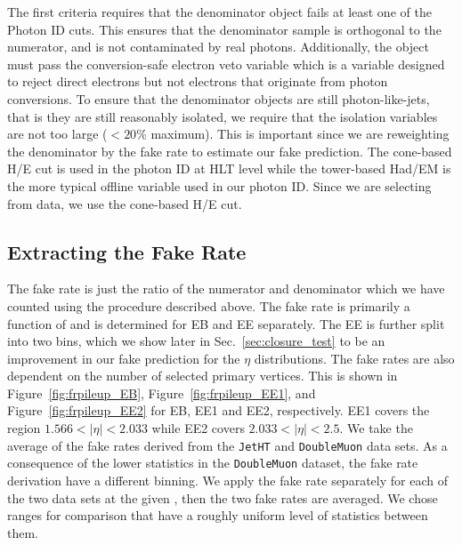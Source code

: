 The first criteria requires that the denominator object fails at least one of the Photon ID cuts. This ensures that the denominator sample is orthogonal to the numerator, and is not contaminated by real photons. Additionally, the object must pass the conversion-safe electron veto variable which is a variable designed to reject direct electrons but not electrons that originate from photon conversions. To ensure that the denominator objects are still photon-like-jets, that is they are still reasonably isolated, we require that the isolation variables are not too large ($<20$\% maximum). This is important since we are reweighting the denominator by the fake rate to estimate our fake prediction. The cone-based H/E cut is used in the photon ID at HLT level while the tower-based Had/EM is the more typical offline variable used in our photon ID. Since we are selecting from data, we use the cone-based H/E cut. 


\subsection{Extracting the Fake Rate}

The fake rate is just the ratio of the numerator and denominator which we have counted using the procedure described above. The fake rate is primarily a function of \pt and is determined for EB and EE separately. The EE is further split into two bins, which we show later in Sec.~\ref{sec:closure_test} to be an improvement in our fake prediction for the $\eta$ distributions. The fake rates are also dependent on the number of selected primary vertices. This is shown in Figure~\ref{fig:frpileup_EB}, Figure~\ref{fig:frpileup_EE1}, and Figure~\ref{fig:frpileup_EE2} for EB, EE1 and EE2, respectively. EE1 covers the region $1.566 < |\eta| < 2.033$ while EE2 covers $2.033 < \lvert \eta \rvert< 2.5$. We take the average of the fake rates derived from the \texttt{JetHT} and \texttt{DoubleMuon} data sets. As a consequence of the lower statistics in the \texttt{DoubleMuon} dataset, the fake rate derivation have a different \pt binning. We apply the fake rate separately for each of the two data sets at the given \pt, then the two fake rates are averaged. We chose ranges for comparison that have a roughly uniform level of statistics between them.

